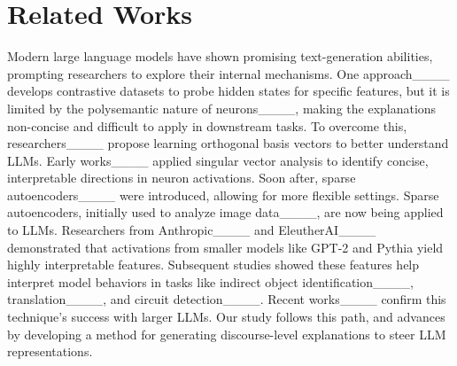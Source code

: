 \section{Related Works}
\vspace{-0.25cm}
Modern large language models have shown promising text-generation abilities, prompting researchers to explore their internal mechanisms. 
One approach____ develops contrastive datasets to probe hidden states for specific features, but it is limited by the polysemantic nature of neurons____, making the explanations non-concise and difficult to apply in downstream tasks. To overcome this, researchers____ propose learning orthogonal basis vectors to better understand LLMs. Early works____ applied singular vector analysis to identify concise, interpretable directions in neuron activations. Soon after, sparse autoencoders____ were introduced, allowing for more flexible settings. 
Sparse autoencoders, initially used to analyze image data____, are now being applied to LLMs. Researchers from Anthropic____ and EleutherAI____ demonstrated that activations from smaller models like GPT-2 and Pythia yield highly interpretable features. Subsequent studies showed these features help interpret model behaviors in tasks like indirect object identification____, translation____, and circuit detection____. Recent works____ confirm this technique's success with larger LLMs. 
Our study follows this path, and advances by developing a method for generating discourse-level explanations to steer LLM representations.

\vspace{-0.1cm}